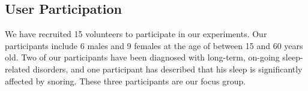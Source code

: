 


\subsection{User Participation} We have recruited 15 volunteers to participate in our experiments. Our
participants include 6 males and 9 females at the age of between 15 and 60 years old. Two of our participants have been diagnosed with
long-term, on-going sleep-related disorders, and one participant has described that his sleep is significantly affected by snoring. These
three participants are our focus group.

